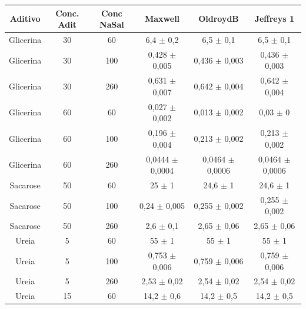 	\begin{table}[h]
	{%
		\begin{tabular}{c c c | c c c }
			\toprule
			 Aditivo  & Conc. Adit & Conc NaSal & Maxwell                & OldroydB                & Jeffreys 1                \\ \midrule
			Glicerina & 30         & 60         & 6,4     \(\pm\) 0,2    & 6,5      \(\pm\) 0,1    & 6,5       \(\pm\) 0,1    \\
			Glicerina & 30         & 100        & 0,428   \(\pm\) 0,005  & 0,436    \(\pm\) 0,003  & 0,436     \(\pm\) 0,003  \\
			Glicerina & 30         & 260        & 0,631   \(\pm\) 0,007  & 0,642    \(\pm\) 0,004  & 0,642     \(\pm\) 0,004  \\
			Glicerina & 60         & 60         & 0,027   \(\pm\) 0,002  & 0,013    \(\pm\) 0,002  & 0,03      \(\pm\) 0      \\
			Glicerina & 60         & 100        & 0,196   \(\pm\) 0,004  & 0,213    \(\pm\) 0,002  & 0,213     \(\pm\) 0,002  \\
			Glicerina & 60         & 260        & 0,0444  \(\pm\) 0,0004 & 0,0464   \(\pm\) 0,0006 & 0,0464    \(\pm\) 0,0006 \\
			Sacarose  & 50         & 60         & 25      \(\pm\) 1      & 24,6     \(\pm\) 1      & 24,6      \(\pm\) 1      \\
			Sacarose  & 50         & 100        & 0,24    \(\pm\) 0,005  & 0,255    \(\pm\) 0,002  & 0,255     \(\pm\) 0,002  \\
			Sacarose  & 50         & 260        & 2,6     \(\pm\) 0,1    & 2,65     \(\pm\) 0,06   & 2,65      \(\pm\) 0,06   \\ \midrule
			  Ureia   & 5          & 60         & 55      \(\pm\) 1      & 55       \(\pm\) 1      & 55        \(\pm\) 1      \\
			  Ureia   & 5          & 100        & 0,753   \(\pm\) 0,006  & 0,759    \(\pm\) 0,006  & 0,759     \(\pm\) 0,006  \\
			  Ureia   & 5          & 260        & 2,53    \(\pm\) 0,02   & 2,54     \(\pm\) 0,02   & 2,54      \(\pm\) 0,02   \\
			  Ureia   & 15         & 60         & 14,2    \(\pm\) 0,6    & 14,2     \(\pm\) 0,5    & 14,2      \(\pm\) 0,5    \\

\end{tabular}}
\end{table}
